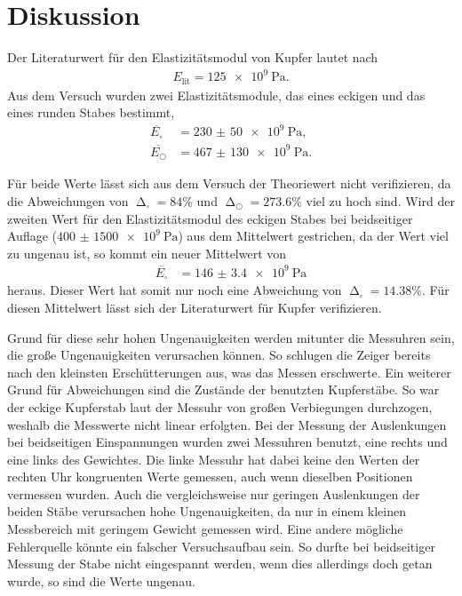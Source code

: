 \section{Diskussion}
\label{sec:Diskussion}

Der Literaturwert für den Elastizitätsmodul von Kupfer lautet nach \cite{czichos}
\begin{align*}
    E_{\text{lit}} = \SI{125e9}{\Pa}.
\end{align*}
Aus dem Versuch wurden zwei Elastizitätsmodule, das eines eckigen und das eines runden Stabes bestimmt,
\begin{align*}
    \overline{E_{\square}} &= \SI{230(50)e9}{\Pa}, \\
    \overline{E_{\bigcirc}} &= \SI{467(130)e9}{\Pa}.
\end{align*}

\sloppy
Für beide Werte lässt sich aus dem Versuch der Theoriewert nicht verifizieren, da die Abweichungen von
$\upDelta_{\square} = 84 \%$ und $\upDelta_{\bigcirc} = 273.6 \%$ viel zu hoch sind.
Wird der zweiten Wert für den Elastizitätsmodul des eckigen Stabes bei beidseitiger Auflage ($\SI{400(1500)e9}{\Pa}$)
aus dem Mittelwert gestrichen, da der Wert viel zu ungenau ist, so kommt ein neuer Mittelwert von
\begin{align*}
    \overline{E_{\square}} &= \SI{146(3.4)e9}{\Pa}
\end{align*}
heraus. Dieser Wert hat somit nur noch eine Abweichung von $\upDelta_{\square} = 14.38 \%$.
Für diesen Mittelwert lässt sich der Literaturwert für Kupfer verifizieren.

Grund für diese sehr hohen Ungenauigkeiten werden mitunter die Messuhren sein, die große Ungenauigkeiten verursachen können.
So schlugen die Zeiger bereits nach den kleinsten Erschütterungen aus, was das Messen erschwerte. 
Ein weiterer Grund für Abweichungen sind die Zustände der benutzten Kupferstäbe. So war der eckige Kupferstab laut der Messuhr
von großen Verbiegungen durchzogen, weshalb die Messwerte nicht linear erfolgten.
Bei der Messung der Auslenkungen bei beidseitigen Einspannungen wurden zwei Messuhren benutzt, eine rechts und eine links des Gewichtes.
Die linke Messuhr hat dabei keine den Werten der rechten Uhr kongruenten Werte gemessen, auch wenn dieselben Positionen vermessen wurden.
Auch die vergleichsweise nur geringen Auslenkungen der beiden Stäbe verursachen hohe Ungenauigkeiten, da nur in einem
kleinen Messbereich mit geringem Gewicht gemessen wird.
Eine andere mögliche Fehlerquelle könnte ein falscher Versuchsaufbau sein. So durfte bei beidseitiger Messung der Stabe nicht
eingespannt werden, wenn dies allerdings doch getan wurde, so sind die Werte ungenau.


